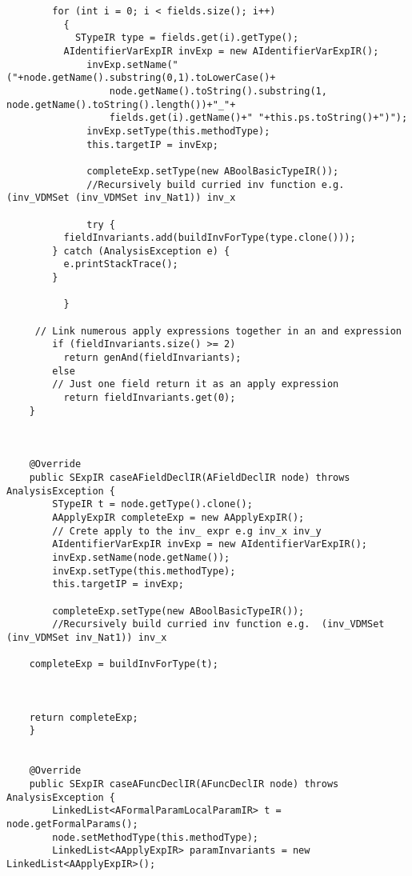 \begin{appendices}
\begin{lstlisting}
        for (int i = 0; i < fields.size(); i++) 
          {
            STypeIR type = fields.get(i).getType();
          AIdentifierVarExpIR invExp = new AIdentifierVarExpIR();
              invExp.setName("("+node.getName().substring(0,1).toLowerCase()+
                  node.getName().toString().substring(1, node.getName().toString().length())+"_"+
                  fields.get(i).getName()+" "+this.ps.toString()+")");
              invExp.setType(this.methodType);
              this.targetIP = invExp;
        
              completeExp.setType(new ABoolBasicTypeIR());
              //Recursively build curried inv function e.g.  (inv_VDMSet (inv_VDMSet inv_Nat1)) inv_x
             
              try {
          fieldInvariants.add(buildInvForType(type.clone()));
        } catch (AnalysisException e) {
          e.printStackTrace();
        }
          
          }
      
     // Link numerous apply expressions together in an and expression
        if (fieldInvariants.size() >= 2)
          return genAnd(fieldInvariants);
        else
        // Just one field return it as an apply expression
          return fieldInvariants.get(0);
    }
    
    
    
    @Override
    public SExpIR caseAFieldDeclIR(AFieldDeclIR node) throws AnalysisException {
        STypeIR t = node.getType().clone();
        AApplyExpIR completeExp = new AApplyExpIR();
        // Crete apply to the inv_ expr e.g inv_x inv_y
        AIdentifierVarExpIR invExp = new AIdentifierVarExpIR();
        invExp.setName(node.getName());
        invExp.setType(this.methodType);
        this.targetIP = invExp;
    
        completeExp.setType(new ABoolBasicTypeIR());
        //Recursively build curried inv function e.g.  (inv_VDMSet (inv_VDMSet inv_Nat1)) inv_x
       
    completeExp = buildInvForType(t);
      
      
      
    return completeExp;
    }
    
    
    @Override
    public SExpIR caseAFuncDeclIR(AFuncDeclIR node) throws AnalysisException {
        LinkedList<AFormalParamLocalParamIR> t = node.getFormalParams();
        node.setMethodType(this.methodType);
        LinkedList<AApplyExpIR> paramInvariants = new LinkedList<AApplyExpIR>();
        

\end{lstlisting}
\end{appendices}
